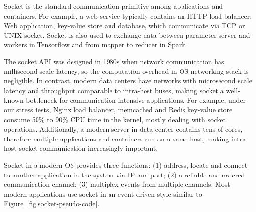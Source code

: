 

Socket is the standard communication primitive among applications and containers.
For example, a web service typically contains an HTTP load balancer, Web application, key-value store and database, which communicate via TCP or UNIX socket.
Socket is also used to exchange data between parameter server and workers in Tensorflow and from mapper to reducer in Spark.

The socket API was designed in 1980s when network communication has millisecond scale latency, so the computation overhead in OS networking stack is negligible.
In contrast, modern data centers have networks with microsecond scale latency and throughput comparable to intra-host buses, making socket a well-known bottleneck for communication intensive applications.
For example, under our stress tests, Nginx load balancer, memcached and Redis key-value store consume 50\% to 90\% CPU time in the kernel, mostly dealing with socket operations.
Additionally, a modern server in data center contains tens of cores, therefore multiple applications and containers run on a same host, making intra-host socket communication increasingly important.

Socket in a modern OS provides three functions:
(1) address, locate and connect to another application in the system via IP and port;
(2) a reliable and ordered communication channel;
(3) multiplex events from multiple channels.
Most modern applications use socket in an event-driven style similar to Figure~\ref{fig:socket-pseudo-code}.




